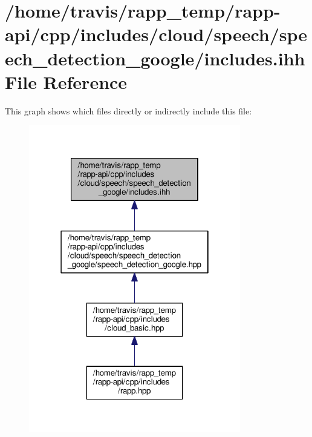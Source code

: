 \hypertarget{cloud_2speech_2speech__detection__google_2includes_8ihh}{\section{/home/travis/rapp\-\_\-temp/rapp-\/api/cpp/includes/cloud/speech/speech\-\_\-detection\-\_\-google/includes.ihh File Reference}
\label{cloud_2speech_2speech__detection__google_2includes_8ihh}
}
This graph shows which files directly or indirectly include this file\-:
\nopagebreak
\begin{figure}[H]
\begin{center}
\leavevmode
\includegraphics[width=262pt]{cloud_2speech_2speech__detection__google_2includes_8ihh__dep__incl}
\end{center}
\end{figure}
